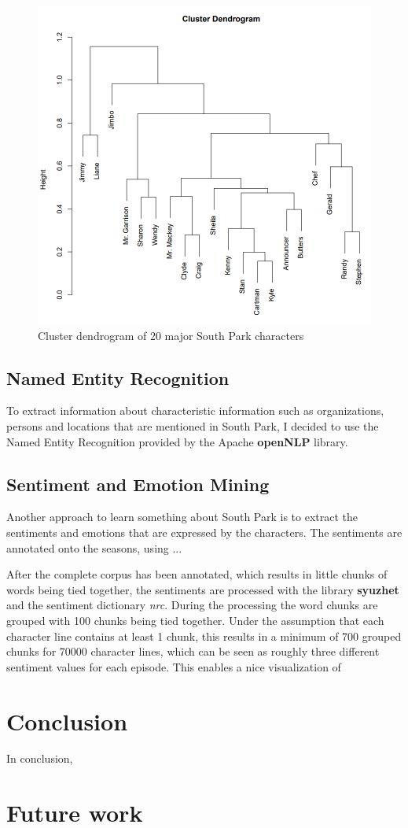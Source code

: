 \documentclass[10pt,a4paper]{article}
\begin{document}
		\begin{figure}[h]
	\centering
	\includegraphics[scale=0.4]{images/Dendrogram.png}
	\caption{Cluster dendrogram of 20 major South Park characters}
	\label{fig:Dendrogram}
	\end{figure}
	\FloatBarrier
	\newpage
	
	\subsection{Named Entity Recognition}
	To extract information about characteristic information such as organizations, persons and locations that are mentioned in South Park, I decided to use the Named Entity Recognition provided by the Apache \textbf{openNLP} library.
	
	\subsection{Sentiment and Emotion Mining}
	Another approach to learn something about South Park is to extract the sentiments and emotions that are expressed by the characters. The sentiments are annotated onto the seasons, using ...
	
	After the complete corpus has been annotated, which results in little chunks of words being tied together, the sentiments are processed with the library \textbf{syuzhet} and the sentiment dictionary \textit{nrc}.
	During the processing the word chunks are grouped with 100 chunks being tied together. Under the assumption that each character line contains at least 1 chunk, this results in a minimum of 700 grouped chunks for 70000 character lines, which can be seen as roughly three different sentiment values for each episode. This enables a nice visualization of 
		
	
	
	\section{Conclusion}
	In conclusion, 

	\section{Future work}
\end{document}
